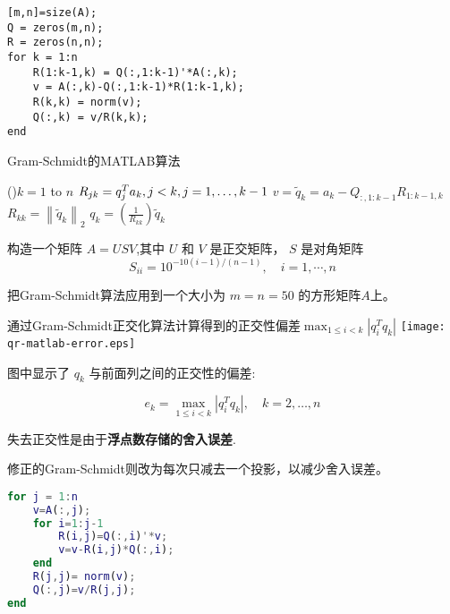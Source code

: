 \begin{example}
    \begin{lstlisting}[caption=Gram Schmidt算法，language=matlab]
[m,n]=size(A);
Q = zeros(m,n);
R = zeros(n,n);
for k = 1:n
    R(1:k-1,k) = Q(:,1:k-1)'*A(:,k);
    v = A(:,k)-Q(:,1:k-1)*R(1:k-1,k);
    R(k,k) = norm(v);
    Q(:,k) = v/R(k,k);
end
    \end{lstlisting}

    \begin{algorithm}[htbp]
        \caption{Gram-Schmidt的MATLAB算法}
        \For(){$k = 1$ to $n$}{
            $R_{ {jk}} =q_j^T a_k ,j<k,j=1,\ldotp \ldotp \ldotp ,k-1$\;
            $v={\tilde{q} }_k =a_k -Q_{:,1:k-1} R_{1:k-1,k}$\;
            $R_{ {kk}} ={\left\|{\tilde{q} }_k \right\|}_2$\;
            $q_k =\left(\frac{1}{R_{kk} }\right){\tilde{q} }_k$\;
        }
    \end{algorithm}

    构造一个矩阵 $ A=U S V $,其中 $ U $ 和 $ V $ 是正交矩阵， $ S $ 是对角矩阵
    \begin{equation}
    S_{i i}=10^{-10(i-1) /(n-1)}, \quad i=1, \cdots, n
    \end{equation}

    把Gram-Schmidt算法应用到一个大小为 $  {m}= {n}=50 $ 的方形矩阵$A$上。

    \begin{FigureCenter}{通过Gram-Schmidt正交化算法计算得到的正交性偏差$\max _{1 \leq i<k}\left|q_{i}^{T} q_{k}\right|$}
        \texttt{[image: qr-matlab-error.eps]}
    \end{FigureCenter}


    图中显示了 $ q_{k} $ 与前面列之间的正交性的偏差:

    \begin{equation}
    e_{k}=\max _{1 \leq i<k}\left|q_{i}^{T} q_{k}\right|, \quad k=2, \ldots, n
    \end{equation}

    失去正交性是由于\textbf{浮点数存储的舍入误差}.

    修正的Gram-Schmidt则改为每次只减去一个投影，以减少舍入误差。

    \begin{lstlisting}[caption=modified Gram-Schmidt算法,language=matlab]
for j = 1:n
    v=A(:,j);
    for i=1:j-1
        R(i,j)=Q(:,i)'*v;
        v=v-R(i,j)*Q(:,i);
    end
    R(j,j)= norm(v);
    Q(:,j)=v/R(j,j);
end
    \end{lstlisting}


\end{example}
